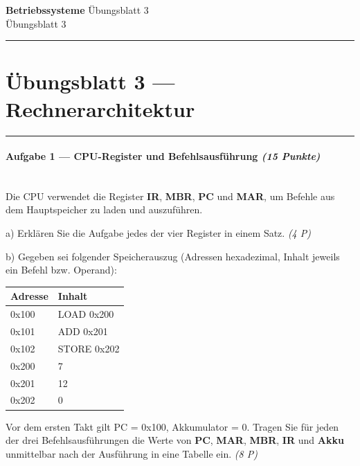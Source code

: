 \documentclass[11pt, a4paper]{article}
\providecommand{\nichttitle}{Übungsblatt}
\providecommand{\nichtsubtitle}{}
\renewcommand{\nichttitle}{Betriebssysteme}
\renewcommand{\nichtsubtitle}{Übungsblatt 3}
\begin{document}
\begin{center}
{\Large\bfseries\color{accent}\nichttitle}
\ifx\nichtsubtitle\empty\else
  \\[2pt]{\normalsize\color{accent!80!black}\nichtsubtitle}
\fi
\\[2pt]
\color{accent}\rule{0.4\linewidth}{0.8pt}\color{black}
\end{center}
\vspace{4pt}


\section{Übungsblatt 3 — Rechnerarchitektur}


\noindent\textcolor{rulegray}{\rule{\linewidth}{0.4pt}}


\paragraph{Aufgabe 1 — CPU-Register und Befehlsausführung \textit{(15 Punkte)}}\mbox{}\\[2pt]

Die CPU verwendet die Register \textbf{IR}, \textbf{MBR}, \textbf{PC} und \textbf{MAR}, um Befehle aus dem Hauptspeicher zu laden und auszuführen.


a) Erklären Sie die Aufgabe jedes der vier Register in einem Satz. \textit{(4 P)}


b) Gegeben sei folgender Speicherauszug (Adressen hexadezimal, Inhalt jeweils ein Befehl bzw. Operand):



{\small
\begin{tabularx}{\linewidth}{XX}
\hline
\rowcolor{tableheadbg}
{\color{white}\textbf{Adresse}} & {\color{white}\textbf{Inhalt}} \\[2pt]
\hline
\endhead
\hline
\endfoot
0x100 & LOAD 0x200 \\
0x101 & ADD  0x201 \\
0x102 & STORE 0x202 \\
0x200 & 7 \\
0x201 & 12 \\
0x202 & 0 \\
\end{tabularx}
}


Vor dem ersten Takt gilt PC = 0x100, Akkumulator = 0. Tragen Sie für jeden der drei Befehlsausführungen die Werte von \textbf{PC}, \textbf{MAR}, \textbf{MBR}, \textbf{IR} und \textbf{Akku} unmittelbar nach der Ausführung in eine Tabelle ein. \textit{(8 P)}
\end{document}
